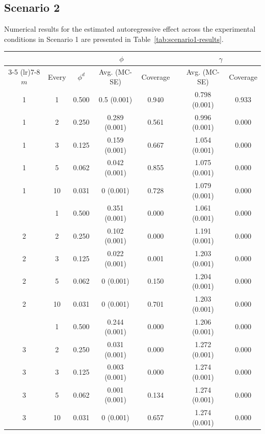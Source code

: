 \documentclass[man]{apa7} %
\begin{document}
\subsection{Scenario 2} \label{app:simulation-scenario2}
Numerical results for the estimated autoregressive effect across the experimental conditions in Scenario 1 are presented in Table~\ref{tab:scenario1-results}. 

 \begin{table}[]
    \centering
    \footnotesize
    \begin{tabular}{cccccccc}
        \toprule
            &       & \multicolumn{3}{c}{$\phi$} & & \multicolumn{2}{c}{$\gamma$} \\
        \cmidrule(lr){3-5} \cmidrule(lr){7-8}
        $m$ & Every & $\phi^{d}$ & Avg. (MC-SE) & Coverage & & Avg. (MC-SE) & Coverage\\
        \midrule
        1 & 1 & 0.500 & 0.5 (0.001) & 0.940 & & 0.798 (0.001) & 0.933\\
        1 & 2 & 0.250 & 0.289 (0.001) & 0.561 & & 0.996 (0.001) & 0.000\\
        1 & 3 & 0.125 & 0.159 (0.001) & 0.667 & & 1.054 (0.001) & 0.000\\
        1 & 5 & 0.062 & 0.042 (0.001) & 0.855 & & 1.075 (0.001) & 0.000\\
        1 & 10 & 0.031 & 0 (0.001) & 0.728 & & 1.079 (0.001) & 0.000\\
        \addlinespace
        2 & 1 & 0.500 & 0.351 (0.001) & 0.000 & & 1.061 (0.001) & 0.000\\
        2 & 2 & 0.250 & 0.102 (0.001) & 0.000 & & 1.191 (0.001) & 0.000\\
        2 & 3 & 0.125 & 0.022 (0.001) & 0.001 & & 1.203 (0.001) & 0.000\\
        2 & 5 & 0.062 & 0 (0.001) & 0.150 & & 1.204 (0.001) & 0.000\\
        2 & 10 & 0.031 & 0 (0.001) & 0.701 & & 1.203 (0.001) & 0.000\\
        \addlinespace
        3 & 1 & 0.500 & 0.244 (0.001) & 0.000 & & 1.206 (0.001) & 0.000\\
        3 & 2 & 0.250 & 0.031 (0.001) & 0.000 & & 1.272 (0.001) & 0.000\\
        3 & 3 & 0.125 & 0.003 (0.001) & 0.000 & & 1.274 (0.001) & 0.000\\
        3 & 5 & 0.062 & 0.001 (0.001) & 0.134 & & 1.274 (0.001) & 0.000\\
        3 & 10 & 0.031 & 0 (0.001) & 0.657 & & 1.274 (0.001) & 0.000\\

\end{tabular}
\end{table}
\end{document}

